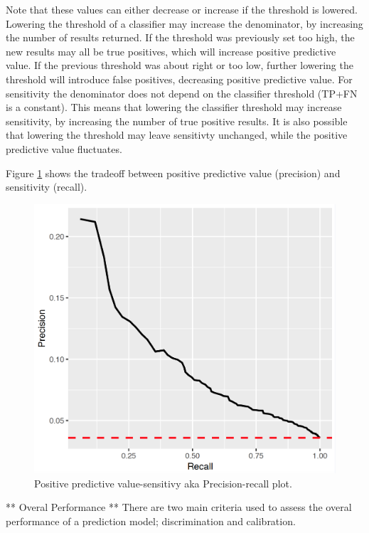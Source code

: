 \documentclass[11pt]{book}
\begin{document}
Note that these values can either decrease or increase if the threshold
is lowered. Lowering the threshold of a classifier may increase the
denominator, by increasing the number of results returned. If the
threshold was previously set too high, the new results may all be true
positives, which will increase positive predictive value. If the
previous threshold was about right or too low, further lowering the
threshold will introduce false positives, decreasing positive predictive
value. For sensitivity the denominator does not depend on the classifier
threshold (TP+FN is a constant). This means that lowering the classifier
threshold may increase sensitivity, by increasing the number of true
positive results. It is also possible that lowering the threshold may
leave sensitivty unchanged, while the positive predictive value
fluctuates.

Figure \ref{fig:plpPrecisionRecall} shows the tradeoff between positive
predictive value (precision) and sensitivity (recall).

\begin{figure}

{\centering \includegraphics[width=0.8\linewidth]{images/PatientLevelPrediction/precisionRecall} 

}

\caption{Positive predictive value-sensitivy aka Precision-recall plot.}\label{fig:plpPrecisionRecall}
\end{figure}

** Overal Performance ** There are two main criteria used to assess the
overal performance of a prediction model; discrimination and
calibration.
\end{document}
